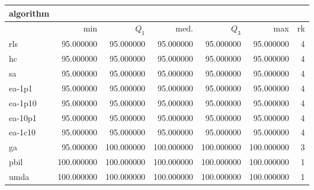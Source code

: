 \begin{tabular}{@{}l*{5}{>{{}}N{3}{0}}>{{}}N{2}{0}@{}}
\toprule
{algorithm} &  \\
\midrule
& {min} & {$Q_1$} & {med.} & {$Q_3$} & {max} & {rk}\\
\midrule
rls & 95.000000 & 95.000000 & 95.000000 & 95.000000 & 95.000000 & 4\\
hc & 95.000000 & 95.000000 & 95.000000 & 95.000000 & 95.000000 & 4\\
sa & 95.000000 & 95.000000 & 95.000000 & 95.000000 & 95.000000 & 4\\
ea-1p1 & 95.000000 & 95.000000 & 95.000000 & 95.000000 & 95.000000 & 4\\
ea-1p10 & 95.000000 & 95.000000 & 95.000000 & 95.000000 & 95.000000 & 4\\
ea-10p1 & 95.000000 & 95.000000 & 95.000000 & 95.000000 & 95.000000 & 4\\
ea-1c10 & 95.000000 & 95.000000 & 95.000000 & 95.000000 & 95.000000 & 4\\
ga & 95.000000 & {\color{blue}} 100.000000 & {\color{blue}} 100.000000 & {\color{blue}} 100.000000 & {\color{blue}} 100.000000 & 3\\
pbil & {\color{blue}} 100.000000 & {\color{blue}} 100.000000 & {\color{blue}} 100.000000 & {\color{blue}} 100.000000 & {\color{blue}} 100.000000 & 1\\
umda & {\color{blue}} 100.000000 & {\color{blue}} 100.000000 & {\color{blue}} 100.000000 & {\color{blue}} 100.000000 & {\color{blue}} 100.000000 & 1\\
\bottomrule
\end{tabular}
